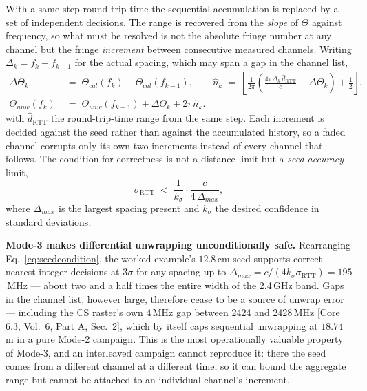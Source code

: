 \documentclass[11pt,a4paper]{article}
\newcommand{\RTT}{\mathrm{RTT}}
\newcommand{\core}[1]{\textcolor{rulegrey}{\small[Core 6.3, #1]}}
\begin{document}
With a same-step round-trip time the sequential accumulation is replaced by a set of independent
decisions. The range is recovered from the \emph{slope} of $\Theta$ against frequency, so what must
be resolved is not the absolute fringe number at any channel but the fringe \emph{increment} between
consecutive measured channels. Writing $\Delta_k = f_k - f_{k-1}$ for the actual spacing, which may
span a gap in the channel list,
\begin{align}
\Delta\Theta_k &\;=\; \Theta_{cal}(f_k)-\Theta_{cal}(f_{k-1}), \qquad
\hat n_k \;=\; \left\lfloor
  \frac{1}{2\pi}\left( \frac{4\pi \Delta_k\, \hat d_{\RTT}}{c} - \Delta\Theta_k \right)
  + \frac12 \right\rfloor, \label{eq:seededunwrap}\\[2pt]
\Theta_{unw}(f_k) &\;=\; \Theta_{unw}(f_{k-1}) + \Delta\Theta_k + 2\pi \hat n_k .
\label{eq:seededunwrap2}
\end{align}
with $\hat d_{\RTT}$ the round-trip-time range from the same step. Each increment is decided against
the seed rather than against the accumulated history, so a faded channel corrupts only its own two
increments instead of every channel that follows. The condition for correctness is not a distance
limit but a \emph{seed accuracy} limit,
\begin{equation}
\sigma_{\RTT} \;<\; \frac{1}{k_\sigma}\cdot\frac{c}{4\,\Delta_{max}},
\label{eq:seedcondition}
\end{equation}
where $\Delta_{max}$ is the largest spacing present and $k_\sigma$ the desired confidence in standard
deviations.

\begin{callout}
\textbf{Mode-3 makes differential unwrapping unconditionally safe.} Rearranging
Eq.~\eqref{eq:seedcondition}, the worked example's $12.8$\,cm seed supports correct nearest-integer
decisions at $3\sigma$ for any spacing up to $\Delta_{max} = c/(4k_\sigma\sigma_{\RTT}) = 195$\,MHz
--- about two and a half times the entire width of the 2.4\,GHz band. Gaps in the channel list,
however large, therefore cease to be a source of unwrap error --- including the CS raster's own
$4$\,MHz gap between 2424 and 2428\,MHz \core{Vol.\ 6, Part A, Sec.\ 2}, which by itself caps
sequential unwrapping at $18.74$\,m in a pure Mode-2 campaign. This is the most operationally
valuable property of Mode-3, and an interleaved campaign cannot reproduce it: there the seed comes
from a different channel at a different time, so it can bound the aggregate range but cannot be
attached to an individual channel's increment.
\end{callout}
\end{document}
